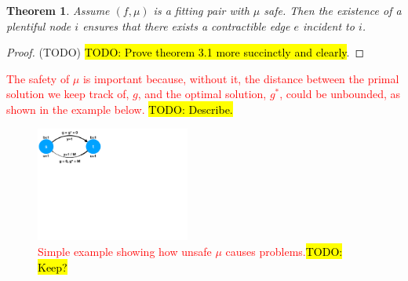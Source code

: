 \documentclass[11pt]{article}
\newtheorem{theorem}{Theorem}[section]
\theoremstyle{definition}
\theoremstyle{definition}
\theoremstyle{definition}
\newcommand{\rewrite}[1]{\textcolor{red}{#1}}
\renewcommand{\todo}[1]{\hl{TODO: #1}}
\begin{document}
    \begin{theorem} Assume $(f, \mu)$ is a fitting pair with $\mu$ safe.
    Then the existence of a plentiful node $i$ ensures
    that there exists a contractible edge $e$ incident to $i$.
    \end{theorem}
    \begin{proof} (TODO)
    \todo{Prove theorem 3.1 more succinctly and clearly}.
    \end{proof}

    \rewrite{The safety of $\mu$ is important because, without it, the distance between
    the primal solution we keep track of, $g$, and the optimal solution, $g^*$, could
    be unbounded, as shown in the example below.} \todo{Describe.}

    \begin{figure}[h]
    \centering
    \includegraphics[width=0.45\textwidth]{figs/unsafe.pdf}
    \caption{
    \label{fig:unsafe}
    \rewrite{Simple example showing how unsafe $\mu$ causes problems.}\todo{Keep?}
    }
    \end{figure}
\end{document}
